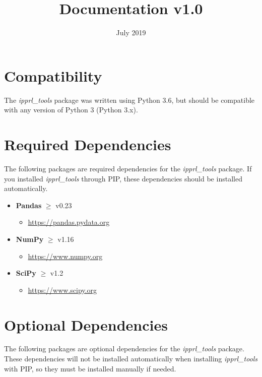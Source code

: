 \documentclass[titlepage, 11pt]{article}
\title{\pkgname{} Documentation v1.0}
\date{July 2019}
\newcommand{\pkgname}{\textit{ipprl\_tools}}
\begin{document}
\maketitle

\tableofcontents
\section{Compatibility}
The \pkgname{} package was written using Python 3.6, but should be compatible with any version of Python 3 (Python 3.x).

\section{Required Dependencies}
The following packages are required dependencies for the \pkgname{} package. If you installed \pkgname{} through PIP, these dependencies should be installed automatically.

    \begin{itemize}
        \item \textbf{Pandas} $\geq$ v0.23
        \begin{itemize}
            \item \url{https://pandas.pydata.org}
        \end{itemize}
        \item \textbf{NumPy} $\geq$ v1.16
        \begin{itemize}
            \item \url{https://www.numpy.org}
        \end{itemize}
        \item \textbf{SciPy} $\geq$ v1.2
        \begin{itemize}
            \item \url{https://www.scipy.org}
        \end{itemize}
    \end{itemize}

\section{Optional Dependencies}
The following packages are optional dependencies for the \pkgname{} package. These dependencies will not be installed automatically when installing \pkgname{} with PIP, so they must be installed manually if needed.
\end{document}
